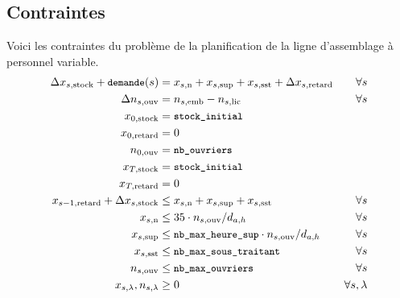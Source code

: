 \subsection*{Contraintes}
Voici les contraintes du problème de la planification
de la ligne d’assemblage à personnel variable.
\begin{align*}
  \Delta x_{s,\text{stock}} + {\small\texttt{demande}}(s) &= x_{s,\text{n}} + x_{s,\text{sup}}
   + x_{s,\text{sst}} + \Delta x_{s,\text{retard}} &\forall s \\
  \Delta n_{s,\text{ouv}} &= n_{s,\text{emb}} - n_{s,\text{lic}} &\forall s \\
  x_{0,\text{stock}}&= {\small\texttt{stock\_initial}} \\
  x_{0,\text{retard}}&= 0 \\
  n_{0,\text{ouv}}&= {\small\texttt{nb\_ouvriers}} \\
  x_{T,\text{stock}}&= {\small\texttt{stock\_initial}} \\
  x_{T,\text{retard}}&= 0 \\
  x_{s-1,\text{retard}} + \Delta x_{s,\text{stock}} &\leq x_{s,\text{n}} + x_{s,\text{sup}} + x_{s,\text{sst}} &\forall s \\
  x_{s,\text{n}} &\leq 35\cdot n_{s,\text{ouv}} / d_{a,h}
  &\forall s \\
  x_{s,\text{sup}} &\leq {\small\texttt{nb\_max\_heure\_sup}}\cdot n_{s,\text{ouv}} / d_{a,h}
  &\forall s \\
  x_{s,\text{sst}} &\leq {\small\texttt{nb\_max\_sous\_traitant}} &\forall s \\
  n_{s,\text{ouv}} &\leq {\small\texttt{nb\_max\_ouvriers}}  &\forall s \\
  x_{s,\lambda}, n_{s,\lambda}&\geq 0 &\forall s, \lambda
\end{align*}
